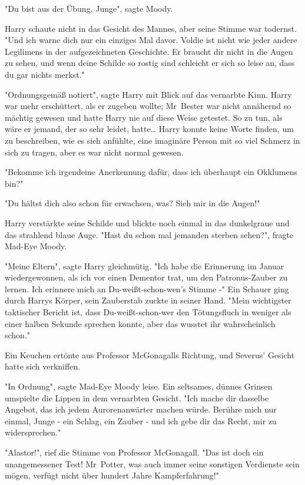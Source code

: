 {"Du bist aus der Übung, Junge", sagte Moody.

Harry schaute nicht in das Gesicht des Mannes, aber seine Stimme war todernst. "Und ich warne dich nur ein einziges Mal davor. Voldie ist nicht wie jeder andere Legilimens in der aufgezeichneten Geschichte. Er braucht dir nicht in die Augen zu sehen, und wenn deine Schilde so rostig sind schleicht er sich so leise an, dass du gar nichts merkst."

"Ordnungsgemäß notiert", sagte Harry mit Blick auf das vernarbte Kinn. Harry war mehr erschüttert, als er zugeben wollte; Mr~Bester war nicht annähernd so mächtig gewesen und hatte Harry nie auf diese Weise getestet. So zu tun, als wäre er jemand, der so sehr leidet, hatte… Harry konnte keine Worte finden, um zu beschreiben, wie es sich anfühlte, eine imaginäre Person mit so viel Schmerz in sich zu tragen, aber es war nicht normal gewesen.

"Bekomme ich irgendeine Anerkennung dafür, dass ich überhaupt ein Okklumens bin?"

"Du hältst dich also schon für erwachsen, was? Sieh mir in die Augen!"

Harry verstärkte seine Schilde und blickte noch einmal in das dunkelgraue und das strahlend blaue Auge. "Hast du schon mal jemanden sterben sehen?", fragte Mad-Eye Moody.

"Meine Eltern", sagte Harry gleichmütig. "Ich habe die Erinnerung im Januar wiedergewonnen, als ich vor einen Dementor trat, um den Patronus-Zauber zu lernen. Ich erinnere mich an Du-weißt-schon-wen's Stimme -" Ein Schauer ging durch Harrys Körper, sein Zauberstab zuckte in seiner Hand. "Mein wichtigster taktischer Bericht ist, dass Du-weißt-schon-wer den Tötungsfluch in weniger als einer halben Sekunde sprechen konnte, aber das wusstet ihr wahrscheinlich schon."

Ein Keuchen ertönte aus Professor McGonagalls Richtung, und Severus' Gesicht hatte sich verkniffen.

"In Ordnung", sagte Mad-Eye Moody leise. Ein seltsames, dünnes Grinsen umspielte die Lippen in dem vernarbten Gesicht. "Ich mache dir dasselbe Angebot, das ich jedem Aurorenanwärter machen würde. Berühre mich nur einmal, Junge - ein Schlag, ein Zauber - und ich gebe dir das Recht, mir zu widersprechen."

"Alastor!", rief die Stimme von Professor McGonagall. "Das ist doch ein unangemessener Test! Mr~Potter, was auch immer seine sonstigen Verdienste sein mögen, verfügt nicht über hundert Jahre Kampferfahrung!"

}

